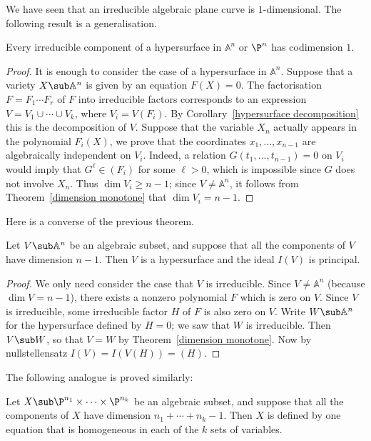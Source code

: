 We have seen that an irreducible algebraic plane curve is $1$-dimensional. The
following result is a generalisation.
\begin{theorem}
Every irreducible component of a hypersurface in $\mathbb{A}^n$ or $\P^n$ has codimension $1$.
\end{theorem}
\begin{proof}
It is enough to consider the case of a hypersurface in $\mathbb{A}^n$. Suppose that a variety $X\sub\mathbb{A}^n$ is given by an equation $F(X)=0$. The factorisation $F=F_1\cdots F_r$ of $F$ into irreducible factors corresponds to an expression $V=V_1\cup\cdots\cup V_k$, where $V_i=V(F_i)$. By Corollary~\ref{hypersurface decomposition} this is the decomposition of $V$. Suppose that the variable $X_n$ actually appears in the polynomial $F_i(X)$, we prove that the coordinates $x_1,\dots,x_{n-1}$ are algebraically independent on $V_i$. Indeed, a relation $G(t_1,\dots,t_{n-1})=0$ on $V_i$ would imply that $G^\ell\in(F_i)$ for some $\ell>0$, which is impossible since $G$ does not involve $X_n$. Thus $\dim V_i\geq n-1$; since $V\neq\mathbb{A}^n$, it follows from Theorem~\ref{dimension monotone} that $\dim V_i=n-1$.
\end{proof}
Here is a converse of the previous theorem.
\begin{theorem}
Let $V\sub\mathbb{A}^n$ be an algebraic subset, and suppose that all the components of $V$ have dimension $n-1$. Then $V$ is a hypersurface and the ideal $I(V)$ is principal.
\end{theorem}
\begin{proof}
We only need consider the case that $V$ is irreducible. Since $V\neq\mathbb{A}^n$ (because $\dim V=n-1$), there exists a nonzero polynomial $F$ which is zero on $V$. Since $V$ is irreducible, some irreducible factor $H$ of $F$ is also zero on $V$. Write $W\sub\mathbb{A}^n$ for the hypersurface defined by $H=0$; we saw that $W$ is irreducible. Then $V\sub W$, so that $V=W$ by Theorem~\ref{dimension monotone}. Now by nullstellensatz $I(V)=I(V(H))=(H)$.
\end{proof}
The following analogue is proved similarly:
\begin{theorem}
Let $X\sub\P^{n_1}\times\cdots\times\P^{n_k}$ be an algebraic subset, and suppose that all the components of $X$ have dimension $n_1+\cdots+n_k-1$. Then $X$ is defined by one equation that is homogeneous in each of the $k$ sets of variables.
\end{theorem}
